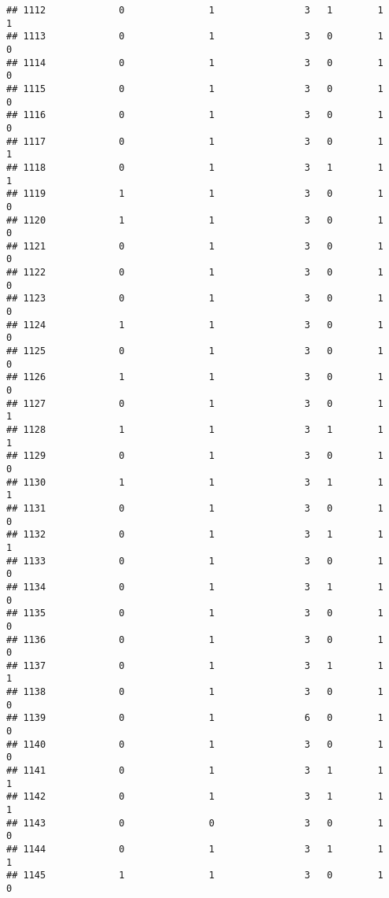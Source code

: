 \documentclass[]{article}
\begin{document}
\begin{verbatim}
## 1112             0               1                3   1        1        1
## 1113             0               1                3   0        1        0
## 1114             0               1                3   0        1        0
## 1115             0               1                3   0        1        0
## 1116             0               1                3   0        1        0
## 1117             0               1                3   0        1        1
## 1118             0               1                3   1        1        1
## 1119             1               1                3   0        1        0
## 1120             1               1                3   0        1        0
## 1121             0               1                3   0        1        0
## 1122             0               1                3   0        1        0
## 1123             0               1                3   0        1        0
## 1124             1               1                3   0        1        0
## 1125             0               1                3   0        1        0
## 1126             1               1                3   0        1        0
## 1127             0               1                3   0        1        1
## 1128             1               1                3   1        1        1
## 1129             0               1                3   0        1        0
## 1130             1               1                3   1        1        1
## 1131             0               1                3   0        1        0
## 1132             0               1                3   1        1        1
## 1133             0               1                3   0        1        0
## 1134             0               1                3   1        1        0
## 1135             0               1                3   0        1        0
## 1136             0               1                3   0        1        0
## 1137             0               1                3   1        1        1
## 1138             0               1                3   0        1        0
## 1139             0               1                6   0        1        0
## 1140             0               1                3   0        1        0
## 1141             0               1                3   1        1        1
## 1142             0               1                3   1        1        1
## 1143             0               0                3   0        1        0
## 1144             0               1                3   1        1        1
## 1145             1               1                3   0        1        0

\end{verbatim}
\end{document}
